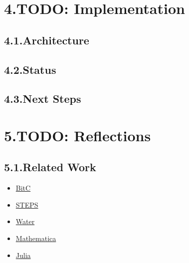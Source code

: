 \documentclass[preprint]{{acmart}}
\begin{document}
\section{4.\hspace*{0.5em}TODO: Implementation}\label{sec-todo--implementation}%

\subsection{4.1.\hspace*{0.5em}Architecture}\label{sec-architecture}%

\subsection{4.2.\hspace*{0.5em}Status}\label{sec-status}%

\subsection{4.3.\hspace*{0.5em}Next Steps}\label{sec-next-steps}%

\section{5.\hspace*{0.5em}TODO: Reflections}\label{sec-todo--reflections}%

\subsection{5.1.\hspace*{0.5em}Related Work}\label{sec-related-work}%

\begin{itemize}[noitemsep,topsep=\mdcompacttopsep]%

\item{}\href{www.cs.jhu.edu/~swaroop/aplas.pdf}{BitC}%

\item{}\href{http://www.vpri.org/pdf/tr2008004_steps08.pdf}{STEPS}%

\item{}\href{http://www.informit.com/articles/article.aspx?p=27567}{Water}%

\item{}\href{https://mathematica.stackexchange.com/questions/2335/metaprogramming-in-mathematica}{Mathematica}%

\item{}\href{https://julialang.org}{Julia}%
\end{itemize}%
\end{document}
